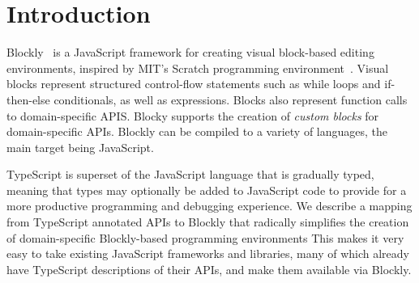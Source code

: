 \section{Introduction}

Blockly~\cite{Blocky2015} is a JavaScript framework for creating visual block-based editing environments, 
inspired by MIT’s Scratch programming environment~\cite{ScratchCACM2009}.  Visual blocks represent structured 
control-flow statements such as while loops and if-then-else conditionals, as well as expressions. 
Blocks also represent function calls to domain-specific APIS. Blocky supports the creation of \emph{custom 
blocks} for domain-specific APIs. Blockly can be compiled to a variety of languages, the main target 
being JavaScript. 

TypeScript is superset of the JavaScript language that is gradually typed, meaning that types may 
optionally be added to JavaScript code to provide for a more productive programming and debugging experience. 
We describe a mapping from TypeScript annotated APIs to Blockly that radically simplifies 
the creation of domain-specific Blockly-based programming environments  This makes it very easy 
to take existing JavaScript frameworks and libraries, many of which already have TypeScript 
descriptions of their APIs, and make them available via Blockly. 
